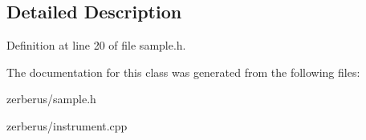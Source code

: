 \subsection{Detailed Description}


Definition at line 20 of file sample.\+h.



The documentation for this class was generated from the following files\+:\begin{DoxyCompactItemize}
\item 
zerberus/sample.\+h\item 
zerberus/instrument.\+cpp\end{DoxyCompactItemize}
